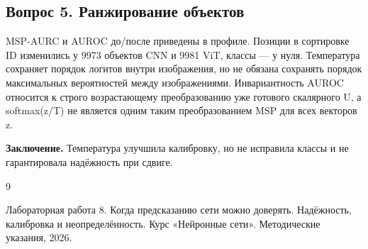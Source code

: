 \subsection*{Вопрос 5. Ранжирование объектов}
MSP-AURC и AUROC до/после приведены в профиле. Позиции в сортировке ID изменились у 9973 объектов CNN и 9981 ViT, классы --- у нуля. Температура сохраняет порядок логитов внутри изображения, но не обязана сохранять порядок максимальных вероятностей между изображениями. Инвариантность AUROC относится к строго возрастающему преобразованию уже готового скалярного U, а softmax(z/T) не является одним таким преобразованием MSP для всех векторов z.

\noindent\textbf{Заключение.} Температура улучшила калибровку, но не исправила классы и не гарантировала надёжность при сдвиге.
\clearpage
\renewcommand{\refname}{Список использованных источников}
\begin{thebibliography}{9}
 Лабораторная работа 8. Когда предсказанию сети можно доверять. Надёжность, калибровка и неопределённость. Курс «Нейронные сети». Методические указания, 2026.
\end{thebibliography}
\clearpage
